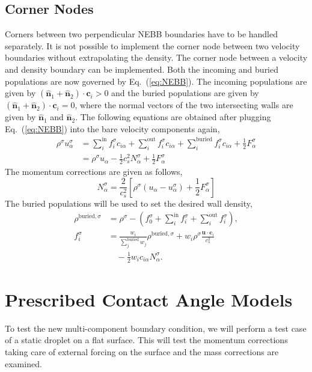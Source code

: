 \documentclass[aps,physrev,twocolumn,10pt]{revtex4-2}
\begin{document}
\subsection{Corner Nodes}
Corners between two perpendicular NEBB boundaries have to be handled separately. It is not possible to implement the corner node between two velocity boundaries without extrapolating the density. The corner node between a velocity and density boundary can be implemented. Both the incoming and buried populations are now governed by Eq.~(\ref{eq:NEBB}). The incoming populations are given by $\left(\hat{\bm{n}}_1 + \hat{\bm{n}}_2\right) \cdot \bm{c}_i > 0$ and the buried populations are given by $\left(\hat{\bm{n}}_1 + \hat{\bm{n}}_2\right) \cdot \bm{c}_i = 0$, where the normal vectors of the two intersecting walls are given by $\hat{\bm{n}}_1$ and $\hat{\bm{n}}_2$. The following equations are obtained after plugging Eq.~(\ref{eq:NEBB}) into the bare velocity components again,
\begin{equation}
\begin{split}
    \rho^\sigma u_{\alpha}^\sigma &= \sum_i^\text{in} f_i^\sigma c_{i\alpha} + \sum_i^\text{out} f_i^\sigma c_{i\alpha} + \sum_i^\text{buried} f_i^\sigma c_{i\alpha} + \frac{1}{2}F_{\alpha}^\sigma\\
    &= \rho^\sigma u_\alpha - \frac{1}{2}c_s^2 N_\alpha^\sigma + \frac{1}{2}F_{\alpha}^\sigma
\end{split}
\end{equation}
The momentum corrections are given as follows,
\begin{equation}
    N_\alpha^\sigma = \frac{2}{c_s^2}\left[\rho^\sigma \left(u_\alpha-u_{\alpha}^\sigma\right) + \frac{1}{2}F_{\alpha}^\sigma\right]
\end{equation}
The buried populations will be used to set the desired wall density,
\begin{equation}
\begin{split}
    \rho^{\text{buried},\sigma} &= \rho^\sigma - \left(f_0^\sigma + \sum_i^\text{in}f_i^\sigma + \sum_i^\text{out}f_i^\sigma\right),\\
    f_i^\sigma&= \frac{w_i}{\sum_j^\text{buried}w_j}\rho^{\text{buried},\sigma} + w_i\rho^\sigma \frac{\bm{u}\cdot \bm{c}_i}{c_s^2}\\
    &\quad- \frac{1}{2} w_i c_{i\alpha}N^\sigma_\alpha. 
\end{split}
\end{equation}

\section{Prescribed Contact Angle Models}
To test the new multi-component boundary condition, we will perform a test case of a static droplet on a flat surface. This will test the momentum corrections taking care of external forcing on the surface and the mass corrections are examined. 
\end{document}
